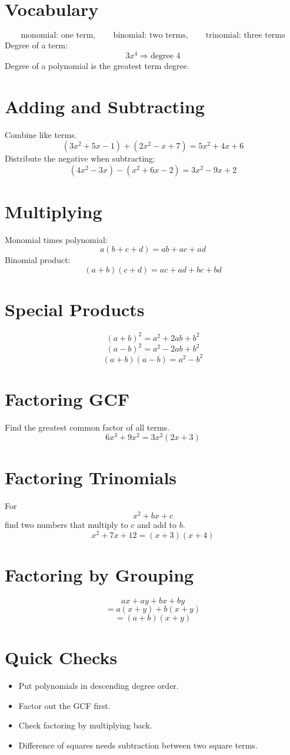 \documentclass[11pt]{article}
\begin{document}

\section*{Vocabulary}
\[
\text{monomial: one term},\qquad
\text{binomial: two terms},\qquad
\text{trinomial: three terms}
\]
Degree of a term:
\[
3x^4 \Rightarrow \text{degree }4
\]
Degree of a polynomial is the greatest term degree.

\section*{Adding and Subtracting}
Combine like terms.
\[
(3x^2+5x-1)+(2x^2-x+7)=5x^2+4x+6
\]
Distribute the negative when subtracting:
\[
(4x^2-3x)-(x^2+6x-2)=3x^2-9x+2
\]

\section*{Multiplying}
Monomial times polynomial:
\[
a(b+c+d)=ab+ac+ad
\]
Binomial product:
\[
(a+b)(c+d)=ac+ad+bc+bd
\]

\section*{Special Products}
\[
(a+b)^2=a^2+2ab+b^2
\]
\[
(a-b)^2=a^2-2ab+b^2
\]
\[
(a+b)(a-b)=a^2-b^2
\]

\section*{Factoring GCF}
Find the greatest common factor of all terms.
\[
6x^3+9x^2=3x^2(2x+3)
\]

\section*{Factoring Trinomials}
For
\[
x^2+bx+c
\]
find two numbers that multiply to $c$ and add to $b$.
\[
x^2+7x+12=(x+3)(x+4)
\]

\section*{Factoring by Grouping}
\[
ax+ay+bx+by
\]
\[
=a(x+y)+b(x+y)
\]
\[
=(a+b)(x+y)
\]

\section*{Quick Checks}
\begin{itemize}
  \item Put polynomials in descending degree order.
  \item Factor out the GCF first.
  \item Check factoring by multiplying back.
  \item Difference of squares needs subtraction between two square terms.
\end{itemize}
\end{document}

